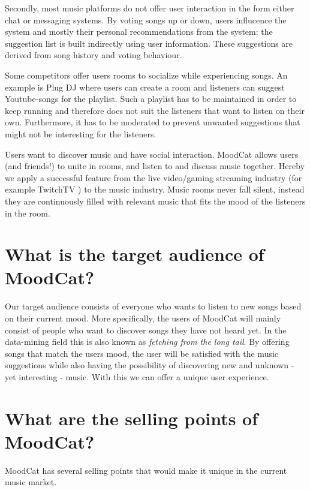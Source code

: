 Secondly, most music platforms do not offer user interaction in the form either chat or messaging systems.
By voting songs up or down, users influcence the system and mostly their personal recommendations from the system: the suggestion list is built indirectly using user information.
These suggestions are derived from song history and voting behaviour.

Some competitors offer users rooms to socialize while experiencing songs.
An example is Plug DJ \cite{PlugDJ} where users can create a room and listeners can suggest Youtube-songs\cite{Youtube} for the playlist.
Such a playlist has to be maintained in order to keep running and therefore does not suit the listeners that want to listen on their own.
Furthermore, it has to be moderated to prevent unwanted suggestions that might not be interesting for the listeners.

\bigskip 

Users want to discover music and have social interaction.
MoodCat allows users (and friends!) to unite in rooms, and listen to and discuss music together.
Hereby we apply a successful feature from the live video/gaming streaming industry (for example TwitchTV \cite{Twitch}) to the music industry.
Music rooms never fall silent, instead they are continuously filled with relevant music that fits the mood of the listeners in the room.

\chapter{What is the target audience of MoodCat?}
Our target audience consists of everyone who wants to listen to new songs based on their current mood.
More specifically, the users of MoodCat will mainly consist of people who want to discover songs they have not heard yet.
In the data-mining field this is also known as \textit{fetching from the long tail}\cite{longtail}.
By offering songs that match the users mood, the user will be satisfied with the music suggestions while also having the possibility of discovering new and unknown - yet interesting - music.
With this we can offer a unique user experience.

\chapter{What are the selling points of MoodCat?}
MoodCat has several selling points that would make it unique in the current music market.

